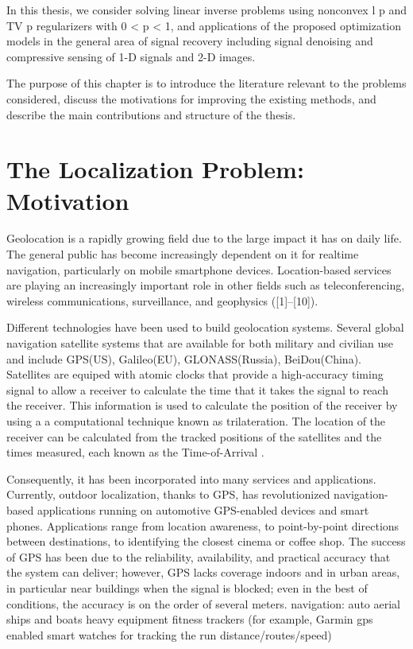 \label{chapter:introduction}


In this thesis, we consider solving linear inverse problems using nonconvex l p and TV p
regularizers with 0 < p < 1, and applications of the proposed optimization models in
the general area of signal recovery including signal denoising and compressive sensing
of 1-D signals and 2-D images. 

The purpose of this chapter is to introduce the
literature relevant to the problems considered, discuss the motivations for improving
the existing methods, and describe the main contributions and structure of the thesis.

\section{The Localization Problem: Motivation} \label{problem}

Geolocation is a rapidly growing field due to the large impact it has on daily life.  The general public has become increasingly dependent on it for realtime navigation, particularly on mobile smartphone devices. Location-based services are  playing an increasingly important role in other fields such as teleconferencing, wireless communications, surveillance, and geophysics \cite{SmithAbel, ShcauRob, Yao, Huang, CheungChan, LiHu, Cheung, Sayed, classMDS} ([1]–[10]).

Different technologies have been used to build geolocation systems. Several global navigation satellite systems that are available for both military and civilian use and include GPS(US), Galileo(EU), GLONASS(Russia), BeiDou(China). Satellites are equiped with atomic clocks that provide a high-accuracy timing signal to  allow a receiver to calculate the time that it takes the signal to reach the receiver. This information is used to calculate the position of the receiver by using a a computational technique known as trilateration. The location of the receiver can be calculated from the
tracked positions of the satellites and the times measured, each known as the Time-of-Arrival \cite{GeoLoc}.



 Consequently, it
has been incorporated into many services and applications. Currently, outdoor
localization, thanks to GPS, has revolutionized navigation-based applications running on automotive GPS-enabled devices and smart phones. Applications range from location awareness, to point-by-point directions between destinations, to identifying the closest cinema or coffee shop. The success of GPS has been due to the reliability, availability, and practical accuracy that the system can deliver; however, GPS lacks coverage indoors and in urban areas, in particular near buildings when the signal is blocked;
even in the best of conditions, the accuracy is on the order of several meters. 
navigation:
auto
aerial
ships and boats
heavy equipment
fitness trackers (for example, Garmin gps enabled smart watches for tracking the run distance/routes/speed)



